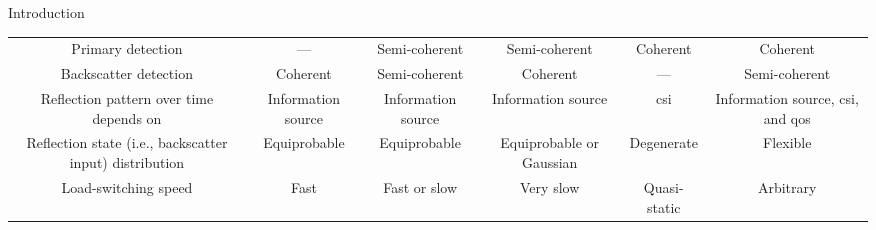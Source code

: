 \documentclass[journal,12pt,onecolumn,draftclsnofoot]{IEEEtran}
\theoremstyle{remark}
\begin{document}
\begin{section}{Introduction}
\begin{table*}[!t]
\begin{tabularx}{\textwidth}{CCCCCC}
			Primary detection                                       & ---                 & Semi-coherent                           & Semi-coherent                                         & Coherent            & Coherent                                                                \\
			Backscatter detection                                   & Coherent            & Semi-coherent                           & Coherent                                              & ---                 & Semi-coherent                                                           \\
			Reflection pattern over time depends on                 & Information source  & Information source                      & Information source                                    & \gls{csi}           & Information source, \gls{csi}, and \gls{qos}                            \\
			Reflection state (i.e., backscatter input) distribution & Equiprobable        & Equiprobable                            & Equiprobable or Gaussian                              & Degenerate          & Flexible                                                                \\
			Load-switching speed                                    & Fast                & Fast or slow                            & Very slow                                             & Quasi-static        & Arbitrary                                                               \\ \bottomrule
		\end{tabularx}
	\end{table*}


\end{section}
\end{document}
